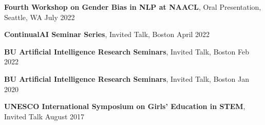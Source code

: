 \textbf{Fourth Workshop on Gender Bias in NLP at NAACL}, Oral Presentation, Seattle, WA \hfill July 2022

\textbf{ContinualAI Seminar Series}, Invited Talk, Boston \hfill April 2022

\textbf{BU Artificial Intelligence Research Seminars}, Invited Talk, Boston \hfill Feb 2022

\textbf{BU Artificial Intelligence Research Seminars}, Invited Talk, Boston \hfill Jan 2020

\textbf{UNESCO International Symposium on Girls' Education in STEM}, Invited Talk \hfill August 2017